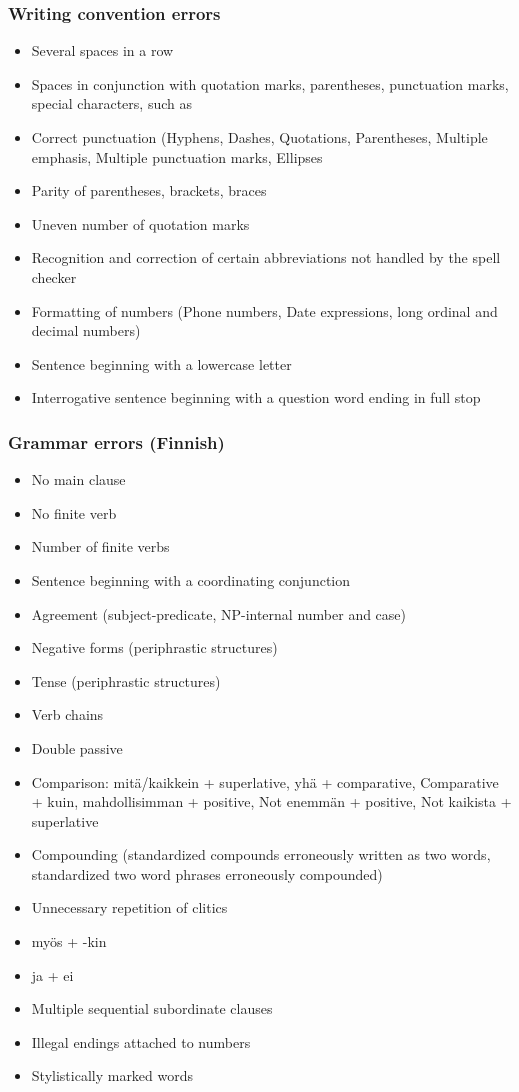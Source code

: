 \documentclass[a4paper,english,12pt]{article}
\begin{document}
\begin{spacing}{1.0}
\subsubsection{Writing convention errors}
\begin{itemize}
    \item Several spaces in a row
    \item Spaces in conjunction with quotation marks, parentheses, punctuation marks, special characters, such as %
	\item Correct punctuation (Hyphens, Dashes, Quotations, Parentheses, Multiple emphasis, Multiple punctuation marks, Ellipses 
	\item Parity of parentheses, brackets, braces
    \item Uneven number of quotation marks 
    \item Recognition and correction of certain abbreviations not handled by the spell checker
    \item Formatting of numbers (Phone numbers, Date expressions, long ordinal and decimal numbers)
    \item Sentence beginning with a lowercase letter
    \item Interrogative sentence beginning with a question word ending in full stop 
\end{itemize}

\subsubsection{Grammar errors (Finnish)}
\begin{itemize}
    \item No main clause
    \item No finite verb
    \item Number of finite verbs
    \item Sentence beginning with a coordinating conjunction 
	\item Agreement (subject-predicate, NP-internal number and case)
    \item Negative forms (periphrastic structures)
    \item Tense (periphrastic structures)
    \item Verb chains
    \item Double passive 
	\item Comparison: mitä/kaikkein + superlative, yhä + comparative, Comparative + kuin, mahdollisimman + positive, Not enemmän + positive, Not kaikista + superlative 
	\item Compounding (standardized compounds erroneously written as two words, standardized two word phrases erroneously compounded) 
 	\item Unnecessary repetition of clitics
    \item myös + -kin
    \item ja + ei
    \item Multiple sequential subordinate clauses
    \item Illegal endings attached to numbers
    \item Stylistically marked words
\end{itemize}


\end{spacing}
\end{document}

